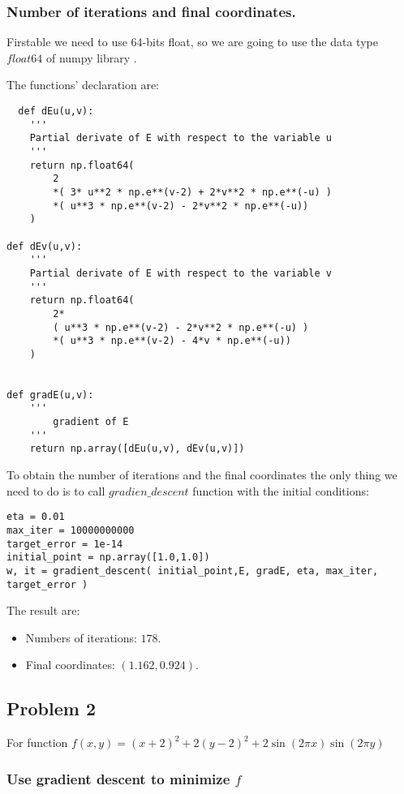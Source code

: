 \subsubsection{Number of iterations and final coordinates.}

Firstable we need to use 64-bits float, so we are going to use the data type $float64$ of numpy library \cite{float64}.

The functions' declaration are:

\begin{verbatim}
  def dEu(u,v):
    '''
    Partial derivate of E with respect to the variable u
    '''
    return np.float64(
        2
        *( 3* u**2 * np.e**(v-2) + 2*v**2 * np.e**(-u) )
        *( u**3 * np.e**(v-2) - 2*v**2 * np.e**(-u))
    )
    
def dEv(u,v):
    '''
    Partial derivate of E with respect to the variable v
    '''
    return np.float64(
        2*
        ( u**3 * np.e**(v-2) - 2*v**2 * np.e**(-u) )
        *( u**3 * np.e**(v-2) - 4*v * np.e**(-u))
    )


def gradE(u,v):
    ''' 
        gradient of E
    '''
    return np.array([dEu(u,v), dEv(u,v)])

\end{verbatim}

To obtain the number of iterations and the final coordinates the only thing we need to do is to call $gradien\_descent$ function with the initial conditions:

\begin{verbatim}
eta = 0.01 
max_iter = 10000000000
target_error = 1e-14
initial_point = np.array([1.0,1.0])
w, it = gradient_descent( initial_point,E, gradE, eta, max_iter, target_error )
\end{verbatim}

The result are:

\begin{itemize}
\item Numbers of iterations: $178.$
\item Final coordinates: $( 1.162 ,  0.924 ).$
\end{itemize}


\subsection{Problem 2}


For function $f(x,y) = (x+2)^2 + 2(y-2)^2 + 2 \sin (2 \pi x) \sin (2 \pi y)$

\subsubsection{ Use gradient descent to minimize $f$}

